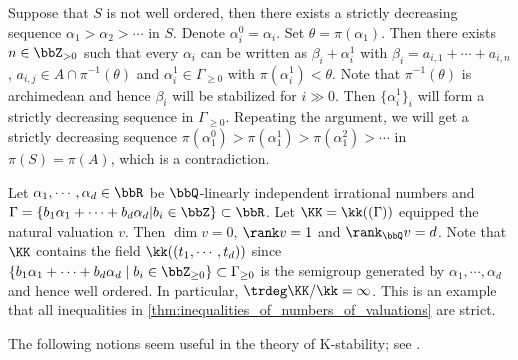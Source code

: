 \begin{remark}
	Suppose that $S$ is not well ordered, then there exists a strictly decreasing sequence $\alpha_1 > \alpha_2 > \cdots$ in $S$.
	Denote $\alpha_i^0 = \alpha_i$.
	Set $\theta = \pi(\alpha_1)$.
	Then there exists $n \in \bbZ_{>0}$ such that every $\alpha_i$ can be written as $\beta_i + \alpha_i^1$ with $\beta_i = a_{i,1} + \cdots + a_{i,n}$, $a_{i,j} \in A \cap \pi^{-1}(\theta)$ and $\alpha_i^1 \in \Gamma_{\geq 0}$ with $\pi(\alpha_i^1) < \theta$.
	Note that $\pi^{-1}(\theta)$ is archimedean and hence $\beta_i$ will be stabilized for $i \gg 0$.
	Then $\{\alpha_i^1\}_i$ will form a strictly decreasing sequence in $\Gamma_{\geq 0}$.
	Repeating the argument, we will get a strictly decreasing sequence $\pi(\alpha_1^0) > \pi(\alpha_1^1) > \pi(\alpha_1^2) > \cdots$ in $\pi(S) = \pi(A)$, which is a contradiction.
\end{remark}

\begin{example}
	Let $\alpha_1,\cdots,\alpha_d \in \bbR$ be $\bbQ$-linearly independent irrational numbers and $\Gamma = \{b_1\alpha_1+\cdots+b_d\alpha_d|b_i \in \bbZ\} \subset \bbR$.
	Let $\KK = \kk((\Gamma))$ equipped the natural valuation $v$.
	Then $\dim v = 0$, $\rank v = 1$ and $\rank_\bbQ v = d$.
	Note that $\KK$ contains the field $\kk((t_1,\cdots,t_d))$ since $\{b_1\alpha_1+\cdots+b_d\alpha_d \mid b_i \in \bbZ_{\geq 0}\} \subset \Gamma_{\geq 0}$ is the semigroup generated by $\alpha_1,\cdots,\alpha_d$ and hence well ordered.
	In particular, $\trdeg \KK/\kk = \infty$.
	This is an example that all inequalities in \cref{thm:inequalities_of_numbers_of_valuations} are strict.
\end{example}

The following notions seem useful in the theory of K-stability; see \cite{LiuXuZhuang2022finite-generation_finite-generation-for-higher-rank-valuation}.

